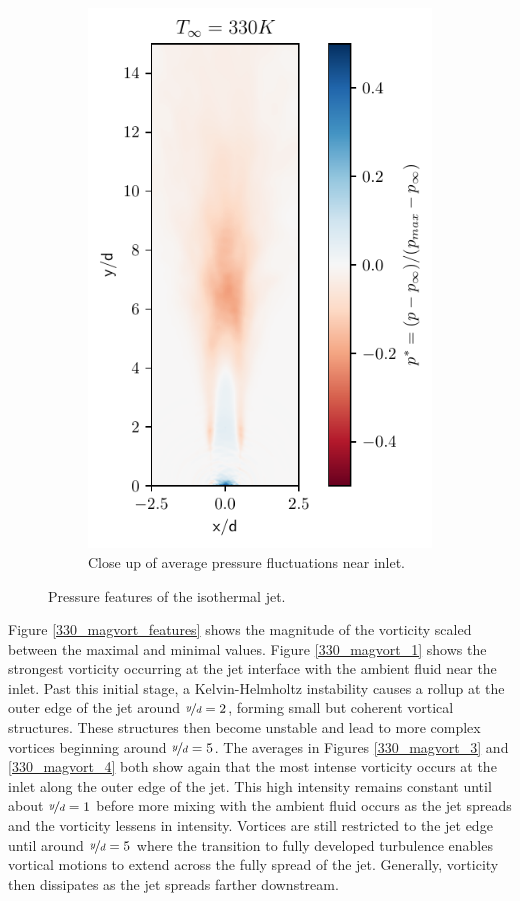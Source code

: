 \begin{figure}[htbp!]
\begin{subfigure}{0.25\textwidth}
	\includegraphics[scale=.65]{figures/Plots/vertical/330/pressure_scaled_vert_avg_330_zoom.pdf}
	\caption{Close up of average pressure fluctuations near inlet.} \label{330_pressure_4}
\end{subfigure}
\caption{Pressure features of the isothermal jet.}
\label{330_pressure_features}
\end{figure}

Figure \ref{330_magvort_features} shows the magnitude of the vorticity scaled between the maximal and minimal values. Figure \ref{330_magvort_1} shows the strongest vorticity occurring at the jet interface with the ambient fluid near the inlet. Past this initial stage, a Kelvin-Helmholtz instability causes a rollup at the outer edge of the jet around $\nicefrac{y}{d} = 2$, forming small but coherent vortical structures. These structures then become unstable and lead to more complex vortices beginning around $\nicefrac{y}{d}= 5$. The averages in Figures \ref{330_magvort_3} and \ref{330_magvort_4} both show again that the most intense vorticity occurs at the inlet along the outer edge of the jet. This high intensity remains constant until about $\nicefrac{y}{d}=1$ before more mixing with the ambient fluid occurs as the jet spreads and the vorticity lessens in intensity. Vortices are still restricted to the jet edge until around $\nicefrac{y}{d} = 5$ where the transition to fully developed turbulence enables vortical motions to extend across the fully spread of the jet. Generally, vorticity then dissipates as the jet spreads farther downstream.

